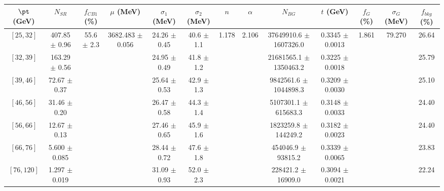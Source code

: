 \begin{tabular}{c||c|c|c|c|c|c|c|c|c|c|c||c}
$\pt$ (GeV) & $N_{SR}$ & $f_{CB1}$ (\%) & $\mu$ (MeV) & $\sigma_1$ (MeV) & $\sigma_2$ (MeV) & $n$ & $\alpha$ & $N_{BG}$ & $t$ (GeV) & $f_G$ (\%) & $\sigma_G$ (MeV) & $f_{bkg}$ (\%) \\
\hline
$[25, 32]$ & 407.85 $\pm$ 0.96 & \multirow{7}{*}{55.6 $\pm$ 2.3} & \multirow{7}{*}{3682.483 $\pm$ 0.056} & 24.26 $\pm$ 0.45 & 40.6 $\pm$ 1.1 & \multirow{7}{*}{1.178} & \multirow{7}{*}{2.106} & 37649910.6 $\pm$ 1607326.0 & 0.3345 $\pm$ 0.0013 & \multirow{7}{*}{1.861} & \multirow{7}{*}{79.270} & 26.64\\
$[32, 39]$ & 163.29 $\pm$ 0.56 &  &  & 24.95 $\pm$ 0.49 & 41.8 $\pm$ 1.2 &  &  & 21681565.1 $\pm$ 1350463.2 & 0.3225 $\pm$ 0.0018 &  &  & 25.79\\
$[39, 46]$ & 72.67 $\pm$ 0.37 &  &  & 25.64 $\pm$ 0.53 & 42.9 $\pm$ 1.3 &  &  & 9842561.6 $\pm$ 1044898.3 & 0.3209 $\pm$ 0.0030 &  &  & 25.10\\
$[46, 56]$ & 31.46 $\pm$ 0.20 &  &  & 26.47 $\pm$ 0.58 & 44.3 $\pm$ 1.4 &  &  & 5107301.1 $\pm$ 615683.3 & 0.3148 $\pm$ 0.0033 &  &  & 24.40\\
$[56, 66]$ & 12.67 $\pm$ 0.13 &  &  & 27.46 $\pm$ 0.65 & 45.9 $\pm$ 1.6 &  &  & 1823259.8 $\pm$ 144249.2 & 0.3182 $\pm$ 0.0023 &  &  & 24.40\\
$[66, 76]$ & 5.600 $\pm$ 0.085 &  &  & 28.44 $\pm$ 0.72 & 47.6 $\pm$ 1.8 &  &  & 454046.9 $\pm$ 93815.2 & 0.3339 $\pm$ 0.0065 &  &  & 23.83\\
$[76, 120]$ & 1.297 $\pm$ 0.019 &  &  & 31.09 $\pm$ 0.93 & 52.0 $\pm$ 2.3 &  &  & 228421.2 $\pm$ 16909.0 & 0.3094 $\pm$ 0.0021 &  &  & 22.24\\
\end{tabular}
